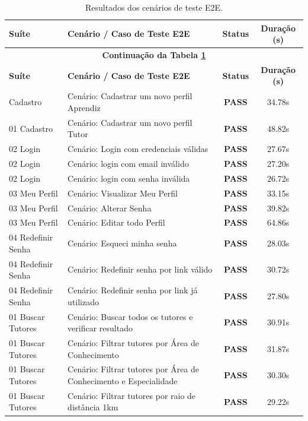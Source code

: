 \begin{landscape}
    \setlength{\oddsidemargin}{\evensidemargin}
    \iniciarCabecalhoTabelaPaisagem
    
    \begin{longtable}{llcc}
\caption{Resultados dos cenários de teste E2E. \label{tab:robotE2E}} \\
\toprule
\textbf{Suíte} & \textbf{Cenário / Caso de Teste E2E} & \textbf{Status} & \textbf{Duração (s)} \\
\midrule
\endfirsthead
\multicolumn{4}{c}{{\bfseries Continuação da Tabela \ref{tab:robotE2E}}} \\
\toprule
\textbf{Suíte} & \textbf{Cenário / Caso de Teste E2E} & \textbf{Status} & \textbf{Duração (s)} \\
\midrule
\endhead
\bottomrule
\endfoot
01 Cadastro & Cenário: Cadastrar um novo perfil Aprendiz & \textbf{PASS} & 34.78s \\
01 Cadastro & Cenário: Cadastrar um novo perfil Tutor & \textbf{PASS} & 48.82s \\
02 Login & Cenário: Login com credenciais válidas & \textbf{PASS} & 27.67s \\
02 Login & Cenário: login com email inválido & \textbf{PASS} & 27.20s \\
02 Login & Cenário: login com senha inválida & \textbf{PASS} & 26.72s \\
03 Meu Perfil & Cenário: Visualizar Meu Perfil & \textbf{PASS} & 33.15s \\
03 Meu Perfil & Cenário: Alterar Senha & \textbf{PASS} & 39.82s \\
03 Meu Perfil & Cenário: Editar todo Perfil & \textbf{PASS} & 64.86s \\
04 Redefinir Senha & Cenário: Esqueci minha senha & \textbf{PASS} & 28.03s \\
04 Redefinir Senha & Cenário: Redefinir senha por link válido & \textbf{PASS} & 30.72s \\
04 Redefinir Senha & Cenário: Redefinir senha por link já utilizado & \textbf{PASS} & 27.80s \\
01 Buscar Tutores & Cenário: Buscar todos os tutores e verificar resultado & \textbf{PASS} & 30.91s \\
01 Buscar Tutores & Cenário: Filtrar tutores por Área de Conhecimento & \textbf{PASS} & 31.87s \\
01 Buscar Tutores & Cenário: Filtrar tutores por Área de Conhecimento e Especialidade & \textbf{PASS} & 30.30s \\
01 Buscar Tutores & Cenário: Filtrar tutores por raio de distância 1km & \textbf{PASS} & 29.22s \\

\end{longtable}
\end{landscape}
